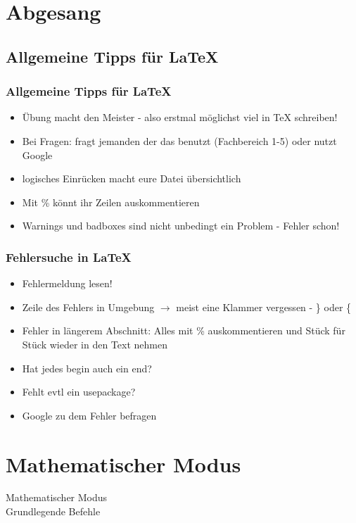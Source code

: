 \documentclass{beamer}
\begin{document}
\section{Abgesang}
\subsection{Allgemeine Tipps für LaTeX}
\begin{frame}
\frametitle{Allgemeine Tipps für \LaTeX}
  \begin{itemize}
    \item<1-> Übung macht den Meister - also erstmal möglichst viel in TeX schreiben!
    \item<2-> Bei Fragen: fragt jemanden der das benutzt (Fachbereich 1-5) oder nutzt Google
    \item<3-> logisches Einrücken macht eure Datei übersichtlich
    \item<4-> Mit \% könnt ihr Zeilen auskommentieren
    \item<5-> Warnings und badboxes sind nicht unbedingt ein Problem - Fehler schon!
  \end{itemize}
\end{frame}

\begin{frame}
\frametitle{Fehlersuche in \LaTeX}
  \begin{itemize}
    \item<1-> Fehlermeldung lesen!
    \item<2-> Zeile des Fehlers in Umgebung $\rightarrow$ meist eine Klammer vergessen - \} oder \{
    \item<3-> Fehler in längerem Abschnitt: Alles mit \% auskommentieren und Stück für Stück wieder in den Text nehmen
    \item<4-> Hat jedes \alert<4>{begin} auch ein \alert<4>{end}?
    \item<5-> Fehlt evtl ein \alert<5>{usepackage}?
    \item<6-> Google zu dem Fehler befragen
  \end{itemize}
\end{frame}



 \section{Mathematischer Modus}
 \begin{frame}
  \begin{center}
   \Huge Mathematischer Modus \\
   \Large Grundlegende Befehle
  \end{center}
 \end{frame}
 
\end{document}
